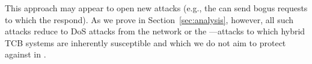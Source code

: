 This approach may appear to open new attacks (e.g., the \medname can send bogus requests to which the \tcboff respond).
As we prove in Section~\ref{sec:analysis}, however, all such attacks reduce to DoS attacks from the network or the \medname---attacks to which hybrid TCB systems are inherently susceptible and which we do not aim to protect against in \tc.


